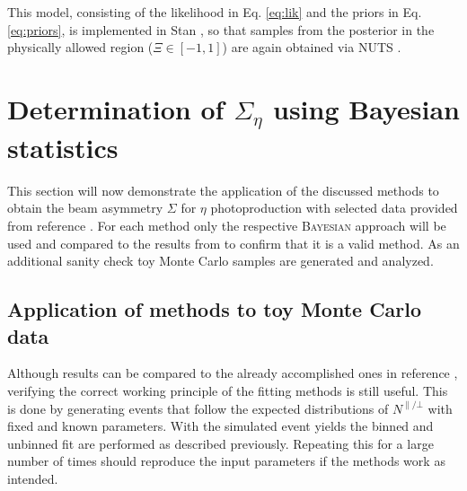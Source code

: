  This model, consisting of the likelihood in Eq. \eqref{eq:lik} and the priors in Eq. \eqref{eq:priors}, is implemented in Stan \cite{stan}, so that samples from the posterior in the physically allowed region ($\Xi\in[-1,1]$) are again obtained via NUTS \cite{nuts}.


\section{Determination of $\Sigma_{\eta}$ using Bayesian statistics}
\label{sec:sigmaeta}
This section will now demonstrate the application of the discussed methods to obtain the beam asymmetry $\Sigma$ for $\eta$ photoproduction with selected data provided from reference \cite{farahphd}. For each method only the respective \textsc{Bayesian} approach will be used and compared to the results from \cite{farahphd} to confirm that it is a valid method. As an additional sanity check toy Monte Carlo samples are generated and analyzed. 
\subsection{Application of methods to toy Monte Carlo data}
\label{subsec:toyMC}
Although results can be compared to the already accomplished ones in reference \cite{farahphd}, verifying the correct working principle of the fitting methods is still useful. This is done by generating events that follow the expected distributions of $N^{\parallel/\bot}$ with fixed and known parameters. With the simulated event yields the binned and unbinned fit are performed as described previously. Repeating this for a large number of times should reproduce the input parameters if the methods work as intended.
